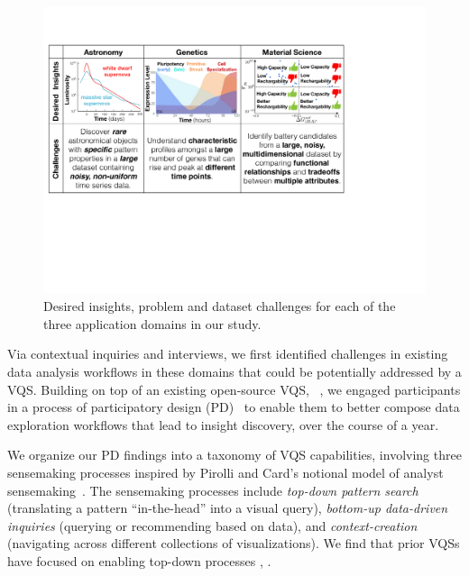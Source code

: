  \begin{figure}[ht!]
 	\centering
 	\includegraphics[width=\linewidth]{figures/science_goal.pdf}
 	\caption{Desired insights, problem and dataset challenges for each of the three application domains in our study.}
 	\label{science_goal}
 	\vspace*{-5pt}
 \end{figure}
 \par Via contextual inquiries and interviews, we first identified challenges in existing data analysis workflows in these domains
 that could be potentially addressed by a VQS. Building on top of an existing open-source VQS, \zv~\cite{Siddiqui2017,Siddiqui2017VLDB}, we engaged participants in a process of participatory design (PD)~\cite{Muller1993,BodkerGronbaek,HoltzblattJones} to enable them to better compose data exploration workflows that lead to insight discovery, over the course of a year.  
 \par We organize our PD findings into a taxonomy of VQS capabilities, involving three sensemaking processes inspired by Pirolli and Card's notional model of analyst sensemaking~\cite{Pirolli}. The sensemaking processes include \emph{top-down pattern search} (translating a pattern ``in-the-head'' into a visual query), \emph{bottom-up data-driven inquiries} (querying or recommending based on data), and \emph{context-creation} (navigating across different collections of visualizations). We find that prior VQSs have focused on enabling top-down processes , .
